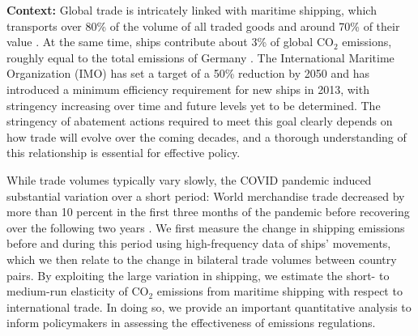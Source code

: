 \documentclass[hidelinks, 12pt,letterpaper]{article}
\begin{document}
\noindent \textbf{Context:} 
Global trade is intricately linked with maritime shipping, which transports over 80\% of the volume of all traded goods and around 70\% of their value \citep{unctad2017review}.
At the same time, ships contribute about 3\% of global CO$_2$ emissions, roughly equal to the total emissions of Germany \citep{faber2020fourth}. The International Maritime Organization (IMO) has set a target of a 50\% reduction by 2050 and has introduced a minimum efficiency requirement for new ships in 2013, with stringency increasing over time and future levels yet to be determined.    %
The stringency of abatement actions required to meet this goal clearly depends on how trade will evolve over the coming decades, and a thorough understanding of this relationship is essential for effective policy.  %



While trade volumes typically vary slowly, the COVID pandemic induced substantial variation over a short period:
World merchandise trade decreased by more than 10 percent in the first three months of the pandemic before recovering over the following two years \citep{oecd21}. %
We first measure the change in shipping emissions before and during this period using high-frequency data of ships' movements, which we then relate to the change in bilateral trade volumes between country pairs. By exploiting the large variation in shipping, we estimate the short- to medium-run elasticity of CO$_2$ emissions from maritime shipping with respect to international trade. In doing so, we provide an
important quantitative analysis to inform policymakers in assessing the effectiveness of emissions regulations.  %
\end{document}
